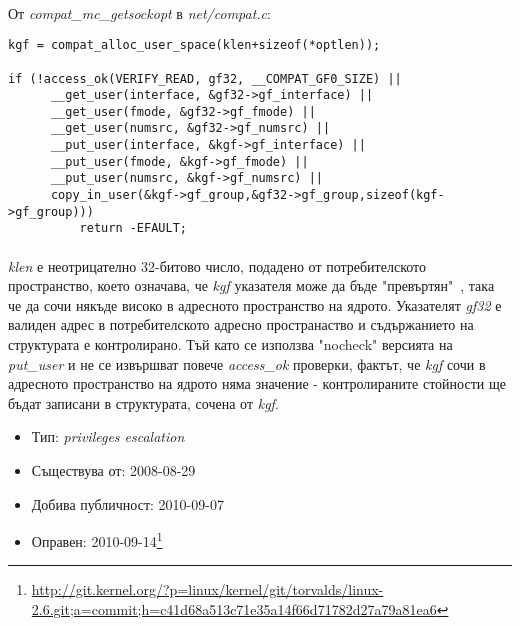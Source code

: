\documentclass[a4paper,12pt,leqno]{article}
\begin{document}
\paragraph{}
От \textit{compat\_mc\_getsockopt} в \textit{net/compat.c}:
\begin{verbatim}
kgf = compat_alloc_user_space(klen+sizeof(*optlen));                            
                                                                                
if (!access_ok(VERIFY_READ, gf32, __COMPAT_GF0_SIZE) ||                         
      __get_user(interface, &gf32->gf_interface) ||                             
      __get_user(fmode, &gf32->gf_fmode) ||                                     
      __get_user(numsrc, &gf32->gf_numsrc) ||                                   
      __put_user(interface, &kgf->gf_interface) ||                              
      __put_user(fmode, &kgf->gf_fmode) ||                                      
      __put_user(numsrc, &kgf->gf_numsrc) ||                                    
      copy_in_user(&kgf->gf_group,&gf32->gf_group,sizeof(kgf->gf_group)))       
          return -EFAULT;
\end{verbatim}
\paragraph{}
\textit{klen} е неотрицателно 32-битово число, подадено от потребителското пространство, което означава, че \textit{kgf} указателя може да бъде "превъртян"\ , така че да сочи някъде високо в адресното пространство на ядрото. Указателят \textit{gf32} е валиден адрес в потребителското адресно пространаство и съдържанието на структурата е контролирано. Тъй като се използва "nocheck" версията на \textit{put\_user} и не се извършват повече \textit{access\_ok} проверки, фактът, че \textit{kgf} сочи в адресното пространство на ядрото няма значение - контролираните стойности ще бъдат записани в структурата, сочена от \textit{kgf}.

\begin{itemize}
    \item Тип: \textit{privileges escalation}
    \item Съществува от: 2008-08-29
  	\item Добива публичност: 2010-09-07
    \item Оправен: 2010-09-14\footnote{\url{http://git.kernel.org/?p=linux/kernel/git/torvalds/linux-2.6.git;a=commit;h=c41d68a513c71e35a14f66d71782d27a79a81ea6}}
\end{itemize}
\end{document}
